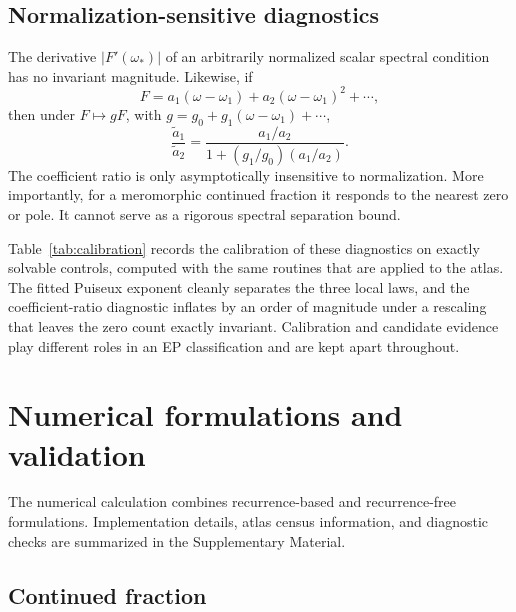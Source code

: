 \documentclass[10pt]{article}
\theoremstyle{plain}
\begin{document}
\subsection{Normalization-sensitive diagnostics}

The derivative $|F'(\omega_*)|$ of an arbitrarily normalized scalar spectral
condition has no invariant magnitude. Likewise, if
\begin{equation}
F=a_1(\omega-\omega_1)+a_2(\omega-\omega_1)^2+\cdots,
\end{equation}
then under $F\mapsto gF$, with $g=g_0+g_1(\omega-\omega_1)+\cdots$,
\begin{equation}
\frac{\widetilde{a}_1}{\widetilde{a}_2}
=\frac{a_1/a_2}{1+(g_1/g_0)(a_1/a_2)} .
\end{equation}
The coefficient ratio is only asymptotically insensitive to normalization. More
importantly, for a meromorphic continued fraction it responds to the nearest
zero or pole. It cannot serve as a rigorous spectral separation bound.

Table~\ref{tab:calibration} records the calibration of these diagnostics on
exactly solvable controls, computed with the same routines that are applied to
the atlas. The fitted Puiseux exponent cleanly separates the three local laws,
and the coefficient-ratio diagnostic inflates by an order of magnitude under a
rescaling that leaves the zero count exactly invariant. Calibration and
candidate evidence play different roles in an EP classification and are kept
apart throughout.

\begin{table}[t]
\centering
\caption{Diagnostic calibration on exactly solvable controls. The fitted
exponent separates square-root, linear, and floored splitting; the
normalization test shows that the coefficient ratio is not an invariant
proximity measure, whereas the argument-principle zero count is.}
\label{tab:calibration}

\end{table}

\section{Numerical formulations and validation}

The numerical calculation combines recurrence-based and recurrence-free
formulations. Implementation details, atlas census information, and diagnostic
checks are summarized in the Supplementary Material.

\subsection{Continued fraction}
\end{document}
